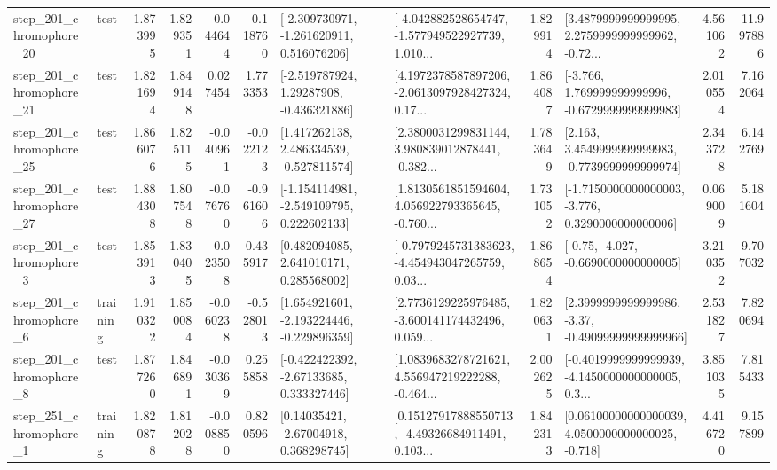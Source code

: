 \begin{tabular}{llrrrrllrlrr}
  step\_201\_chromophore\_20 &      test &      1.873995 &    1.829351 &     -0.044644 & -0.118760 &   [-2.309730971, -1.261620911, 0.516076206] &  [-4.042882528654747, -1.577949522927739, 1.010... &       1.829914 &  [3.4879999999999995, 2.2759999999999962, -0.72... &            4.561062 &         11.997886 \\
  step\_201\_chromophore\_21 &      test &      1.821694 &    1.849148 &      0.027454 &  1.773353 &    [-2.519787924, 1.29287908, -0.436321886] &  [4.1972378587897206, -2.0613097928427324, 0.17... &       1.864087 &   [-3.766, 1.769999999999996, -0.6729999999999983] &            2.010554 &          7.162064 \\
  step\_201\_chromophore\_25 &      test &      1.866076 &    1.825115 &     -0.040961 & -0.022123 &    [1.417262138, 2.486334539, -0.527811574] &  [2.3800031299831144, 3.980839012878441, -0.382... &       1.783649 &   [2.163, 3.4549999999999983, -0.7739999999999974] &            2.343728 &          6.142769 \\
  step\_201\_chromophore\_27 &      test &      1.884308 &    1.807548 &     -0.076760 & -0.961606 &   [-1.154114981, -2.549109795, 0.222602133] &  [1.8130561851594604, 4.056922793365645, -0.760... &       1.731052 &  [-1.7150000000000003, -3.776, 0.3290000000000006] &            0.069009 &          5.181604 \\
   step\_201\_chromophore\_3 &      test &      1.853913 &    1.830405 &     -0.023508 &  0.435917 &     [0.482094085, 2.641010171, 0.285568002] &  [-0.7979245731383623, -4.454943047265759, 0.03... &       1.868654 &               [-0.75, -4.027, -0.6690000000000005] &            3.210352 &          9.707032 \\
   step\_201\_chromophore\_6 &  training &      1.910322 &    1.850084 &     -0.060238 & -0.528013 &   [1.654921601, -2.193224446, -0.229896359] &  [2.7736129225976485, -3.600141174432496, 0.059... &       1.820631 &  [2.3999999999999986, -3.37, -0.49099999999999966] &            2.531827 &          7.820694 \\
   step\_201\_chromophore\_8 &      test &      1.877260 &    1.846891 &     -0.030369 &  0.255858 &    [-0.422422392, -2.67133685, 0.333327446] &  [1.0839683278721621, 4.556947219222288, -0.464... &       2.002625 &  [-0.4019999999999939, -4.1450000000000005, 0.3... &            3.851035 &          7.815433 \\
   step\_251\_chromophore\_1 &  training &      1.820878 &    1.812028 &     -0.008850 &  0.820596 &      [0.14035421, -2.67004918, 0.368298745] &  [0.15127917888550713, -4.49326684911491, 0.103... &       1.842313 &  [0.06100000000000039, 4.0500000000000025, -0.718] &            4.416720 &          9.157899 \\

\end{tabular}
